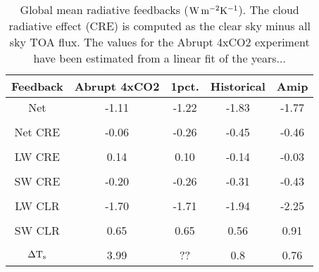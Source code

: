 \documentclass[draft]{agujournal2019}
\begin{document}
\begin{table}
\begin{center}
\caption{Global mean radiative feedbacks ($\rm{W\, m^{-2} K^{-1}}$).  The cloud radiative effect (CRE) is computed as
 the clear sky minus all sky TOA flux. The values for the Abrupt 4xCO2 experiment
have been estimated from a linear fit of the years... }
    \begin{tabular}{*{5}{c}}
    \hline
    \hline
 Feedback   & Abrupt 4xCO2 & 1pct.   & Historical    &  Amip   \\ \hline
    Net          &   -1.11      &  -1.22          &  -1.83         & -1.77               \\ 
    \\
    Net CRE   & -0.06       &  -0.26          & -0.45         & -0.46           \\  
    \\
    LW CRE   & 0.14        &  0.10            & -0.14           & -0.03          \\  
    \\
    SW CRE  & -0.20       &  -0.26            & -0.31          & -0.43         \\  
    \\
    LW CLR   & -1.70       &  -1.71            & -1.94           & -2.25        \\  
    \\
    SW CLR  & 0.65        & 0.65              & 0.56             & 0.91          \\  
    \\
    $\Delta \rm{T}_s$        & 3.99        &  ??                & 0.8              & 0.76          \\  \hline

    \end{tabular}\par
    \label{tab:lambda}
\end{center}
\end{table}
\end{document}
